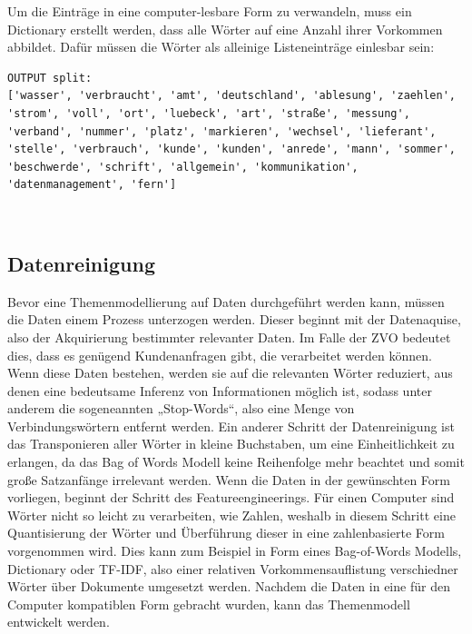 \documentclass[german,version-2020-11]{uzl-thesis}
\begin{document}
Um die Einträge in eine computer-lesbare Form zu verwandeln, muss ein Dictionary erstellt werden, dass alle Wörter auf eine Anzahl ihrer Vorkommen abbildet. Dafür müssen die Wörter als alleinige Listeneinträge einlesbar sein: \\


\begin{lstlisting}
OUTPUT split: 
['wasser', 'verbraucht', 'amt', 'deutschland', 'ablesung', 'zaehlen', 'strom', 'voll', 'ort', 'luebeck', 'art', 'straße', 'messung', 'verband', 'nummer', 'platz', 'markieren', 'wechsel', 'lieferant', 'stelle', 'verbrauch', 'kunde', 'kunden', 'anrede', 'mann', 'sommer', 'beschwerde', 'schrift', 'allgemein', 'kommunikation', 'datenmanagement', 'fern']
\end{lstlisting}\\


\subsection{Datenreinigung}
Bevor eine Themenmodellierung auf Daten durchgeführt werden kann, müssen die Daten einem Prozess unterzogen werden. Dieser beginnt mit der Datenaquise, also der Akquirierung bestimmter relevanter Daten. Im Falle der ZVO bedeutet dies, dass es genügend Kundenanfragen gibt, die verarbeitet werden können. Wenn diese Daten bestehen, werden sie auf die relevanten Wörter reduziert, aus denen eine bedeutsame Inferenz von Informationen möglich ist, sodass unter anderem die sogeneannten „Stop-Words“, also eine Menge von Verbindungswörtern entfernt werden. Ein anderer Schritt der Datenreinigung ist das Transponieren aller Wörter in kleine Buchstaben, um eine Einheitlichkeit zu erlangen, da das Bag of Words Modell keine Reihenfolge mehr beachtet und somit große Satzanfänge irrelevant werden. Wenn die Daten in der gewünschten Form vorliegen, beginnt der Schritt des Featureengineerings. Für einen Computer sind Wörter nicht so leicht zu verarbeiten, wie Zahlen, weshalb in diesem Schritt eine Quantisierung der Wörter und Überführung dieser in eine zahlenbasierte Form vorgenommen wird. Dies kann zum Beispiel in Form eines Bag-of-Words Modells, Dictionary oder TF-IDF, also einer relativen Vorkommensauflistung verschiedner Wörter über Dokumente umgesetzt werden. Nachdem die Daten in eine für den Computer kompatiblen Form gebracht wurden, kann das Themenmodell entwickelt werden. 
\end{document}

